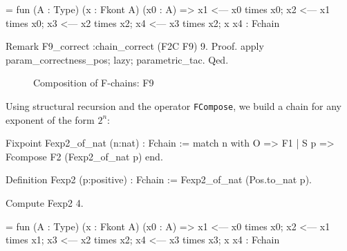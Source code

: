 \begin{Coqanswer}
= fun (A : Type) (x : Fkont A) (x0 : A) =>
       x1 <--- x0 times x0;
       x2 <--- x1 times x0; x3 <--- x2 times x2; 
       x4 <--- x3 times x2; 
       x x4
     : Fchain  
\end{Coqanswer}

\begin{Coqsrc}
Remark F9_correct :chain_correct (F2C F9) 9.
Proof.
  apply param_correctness_pos;  lazy;  parametric_tac.
Qed.
\end{Coqsrc}

\begin{figure}[h]
  \centering
  \caption{Composition  of F-chains: F9}
  \label{fig:F9}
\end{figure}

Using structural recursion and the operator \texttt{FCompose},
we build a chain for any exponent of the form $2^n$:

\begin{Coqsrc}
 Fixpoint  Fexp2_of_nat (n:nat) : Fchain :=
 match n with O => F1
            | S p => Fcompose F2 (Fexp2_of_nat p)
 end.


Definition Fexp2 (p:positive) : Fchain :=
  Fexp2_of_nat (Pos.to_nat p). 

Compute Fexp2  4.
\end{Coqsrc}

\begin{Coqanswer}
 = fun (A : Type) (x : Fkont A) (x0 : A) =>
       x1 <--- x0 times x0;
       x2 <--- x1 times x1; x3 <--- x2 times x2; 
       x4 <--- x3 times x3; x x4
     : Fchain
\end{Coqanswer}

